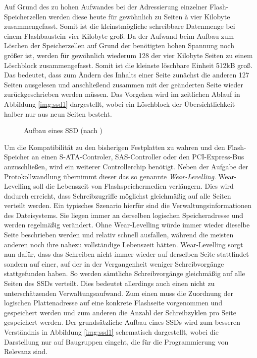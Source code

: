 Auf Grund des zu hohen Aufwandes bei der Adressierung einzelner Flash-Speicherzellen werden diese heute für gewöhnlich zu Seiten à vier Kilobyte zusammengefasst.
Somit ist die kleinstmögliche schreibbare Datenmenge bei einem Flashbaustein vier Kilobyte groß. Da der Aufwand beim Aufbau zum Löschen der Speicherzellen auf
Grund der benötigten hohen Spannung noch größer ist, werden für gewöhnlich wiederum 128 der vier Kilobyte Seiten zu einem Löschblock zusammengefasst. Somit ist
die kleinste löschbare Einheit 512kB groß. Das bedeutet, dass zum Ändern des Inhalts einer Seite zunächst die anderen 127 Seiten ausgelesen und anschließend
zusammen mit der geänderten Seite wieder zurückgeschrieben werden müssen. Das Vorgehen wird im zeitlichen Ablauf in Abbildung \ref{img:ssd1} dargestellt, wobei
ein Löschblock der Übersichtlichkeit halber nur aus neun Seiten besteht.

\begin{figure}[b!]\centering
	\caption[Aufbau eines SSD]{Aufbau eines SSD (nach \textcite{anand1})}
	\label{img:ssd2}
\end{figure}

Um die Kompatibilität zu den bisherigen Festplatten zu wahren und den Flash-Speicher an einen \mbox{S-ATA}-Controler, SAS-Controller oder den PCI-Express-Bus
anzuschließen, wird ein weiterer Controllerchip benötigt. Neben der Aufgabe der Protokollwandlung übernimmt dieser das so genannte \textit{Wear-Levelling}.
Wear-Levelling soll die Lebenszeit von Flashspeichermedien verlängern. Dies wird dadurch erreicht, dass Schreibzugriffe möglichst gleichmäßig auf alle Seiten
verteilt werden. Ein typisches Szenario hierfür sind die Verwaltungsinformationen des Dateisystems. Sie liegen immer an derselben logischen Speicheradresse und
werden regelmäßig verändert. Ohne Wear-Levelling würde immer wieder dieselbe Seite beschrieben werden und relativ schnell ausfallen, während die meisten anderen
noch ihre nahezu vollständige Lebenszeit hätten. Wear-Levelling sorgt nun dafür, dass das Schreiben nicht immer wieder auf derselben Seite stattfindet sondern
auf einer, auf der in der Vergangenheit weniger Schreibvorgänge stattgefunden haben. So werden sämtliche Schreibvorgänge gleichmäßig auf alle Seiten des
\ac{SSD}s verteilt. Dies bedeutet allerdings auch einen nicht zu unterschätzenden Verwaltungsaufwand. Zum einen muss die Zuordnung der logischen Plattenadresse
auf eine konkrete Flashseite vorgenommen und gespeichert werden und zum anderen die Anzahl der Schreibzyklen pro Seite gespeichert werden. Der grundsätzliche
Aufbau eines \ac{SSD}s wird zum besseren Verständnis in Abbildung \ref{img:ssd1} schematisch dargestellt, wobei die Darstellung nur auf Baugruppen eingeht, die
für die Programmierung von Relevanz sind.

